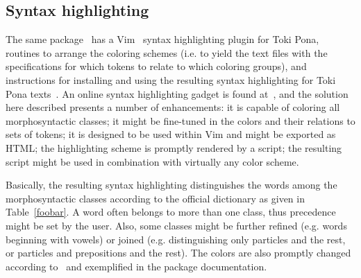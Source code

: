 

\subsection{Syntax highlighting}\label{shigh}
The same package~\cite{tokipona}
has a Vim~\cite{vim} syntax highlighting plugin
for Toki Pona,
routines to arrange the coloring schemes
(i.e. to yield the text files with the specifications for which tokens
to relate to which coloring groups),
and instructions for installing and using
the resulting syntax highlighting for Toki Pona texts~\cite{tokipona}.
An online syntax highlighting gadget is found at~\cite{tpNetSH},
and the solution here described presents a number of enhancements:
it is capable of coloring all morphosyntactic classes;
it might be fine-tuned in the colors and their relations to sets of
tokens; it is designed to be used within Vim
and might be exported as HTML; the highlighting scheme is promptly
rendered by a script; the resulting script might be used in combination
with virtually any color scheme.

Basically, the resulting syntax highlighting
distinguishes the words among the morphosyntactic
classes according to the official dictionary as given in
Table~\ref{foobar}.
A word often belongs to more than one class,
thus precedence might be set by the user.
Also, some classes might be further refined (e.g. words beginning with
vowels) or joined (e.g. distinguishing only particles and the rest,
or particles and prepositions and the rest).
The colors are also promptly changed according to~\cite{vim}
and exemplified in the package documentation.

